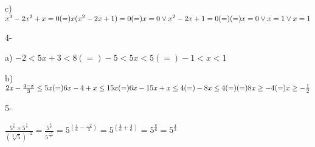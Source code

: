 \documentclass[11pt]{article}
\begin{document}
c) $x^3-2x^2+x = 0(=) x(x^2-2x+1)=0 (=) x=0\lor x^2-2x+1=0 (=)\break (=) x=0 \lor x=1 \lor x=1$
\vspace{5mm}

{\large 4-}

a) $-2<5x+3<8 (=) -5<5x<5 (=) -1<x<1$
\vspace{5mm}

b) $2x-\frac{4-x}{3}\leq 5x (=)6x-4+x\leq 15x (=) 6x-15x+x \leq 4 (=) -8x \leq 4 (=)\break (=) 8x \geq -4 (=) x\geq-\frac{1}{2}$\\
\vspace{5mm}

{\large 5-}
\vspace{5mm}

$\frac{5^\frac{1}{6}\times 5^\frac{1}{2}}{(\sqrt[3]{5})^{-2}} = 
\frac{5^\frac{4}{6}}{5^{\frac{-2}{3}}}=
5^{(\frac{4}{6}-\frac{-2}{3})}=
5^{(\frac{4}{6}+\frac{4}{6})}=
5^{\frac{8}{6}}=
5^{\frac{4}{3}}$
\end{document}
